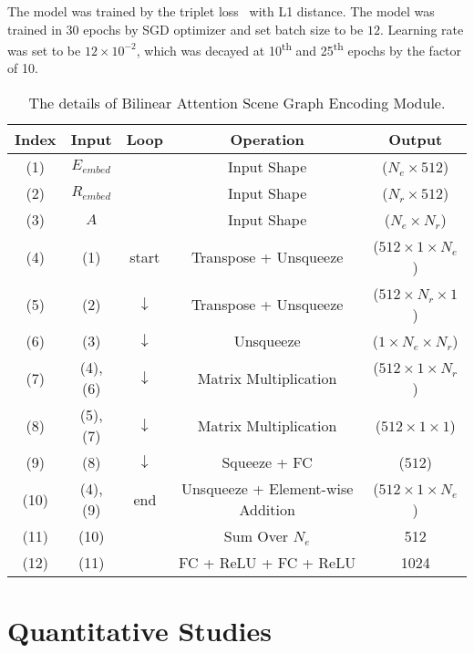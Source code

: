 \documentclass[10pt,twocolumn,letterpaper]{article}
\begin{document}
The model was trained by the triplet loss~\cite{schroff2015facenet} with L1 distance. The model was trained in 30 epochs by SGD optimizer and set batch size to be $12$. Learning rate was set to be $12\times 10^{-2}$, which was decayed at 10\textsuperscript{th} and 25\textsuperscript{th} epochs by the factor of 10.

\begin{table}
\centering
\scalebox{0.65}
{
\begin{tabular}{| c | c | c | c | c |}
\hline
Index & Input & Loop & Operation & Output \\
\hline 
(1) & $E_{embed}$ &  & Input Shape & ($N_e\times 512$) \\
\hline 
(2) & $R_{embed}$ &  & Input Shape & ($N_r\times 512$) \\
\hline 
(3) & $A$ & & Input Shape & ($N_e\times N_r$) \\
\hline
(4) & (1) & start & Transpose + Unsqueeze & ($512\times 1\times N_e$) \\
\hline
(5) & (2) & $\downarrow$ & Transpose + Unsqueeze & ($512\times N_r\times 1$) \\
\hline
(6) & (3) & $\downarrow$ & Unsqueeze &  ($1\times N_e\times N_r$) \\
\hline
(7) & (4),(6) & $\downarrow$ & Matrix Multiplication & ($512\times 1\times N_r$) \\
\hline
(8) & (5),(7) & $\downarrow$ & Matrix Multiplication & ($512\times 1\times 1$) \\
\hline
(9) & (8) & $\downarrow$ & Squeeze + FC & ($512$) \\
\hline
(10) & (4),(9) & end & Unsqueeze + Element-wise Addition & ($512\times 1\times N_e$) \\
\hline
(11) & (10) &  & Sum Over $N_e$ & 512 \\
\hline
(12) & (11) & & FC + ReLU + FC + ReLU & 1024 \\
\hline
\end{tabular}
}
\caption{The details of Bilinear Attention Scene Graph Encoding Module.}
\label{supp_tab:3}
\end{table}

\section{Quantitative Studies}
\label{sec:quantitative}
\end{document}
